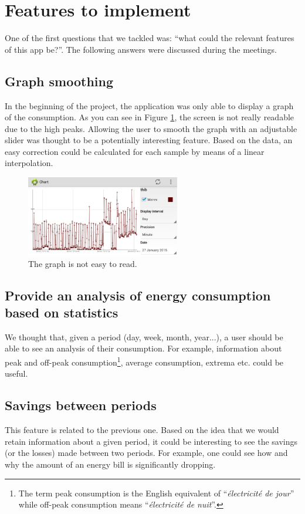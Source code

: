 \documentclass[a4paper, oneside, 11pt]{book}
\begin{document}
\section{Features to implement}
One of the first questions that we tackled was: “what could the relevant features of this app be?”.  The following answers were discussed during the meetings. 

\subsection{Graph smoothing}
In the beginning of the project, the application was only able to display a graph of the consumption. As you can see in Figure \ref{fig:chart_high_peaks}, the screen is not really readable due to the high peaks. Allowing the user to smooth the graph with an adjustable slider was thought to be a potentially interesting feature. Based on the data, an easy correction could be calculated for each sample by means of a linear interpolation. 

\begin{figure}[htbp]
	\centerline{\includegraphics[width=0.6\textwidth]{chart_high_peaks.png}}
	\caption{The graph is not easy to read.}
	\label{fig:chart_high_peaks}
\end{figure}

\subsection{Provide an analysis of energy consumption based on statistics}
We thought that, given a period (day, week, month, year...), a user should be able to see an analysis of their consumption. For example, information about peak and off-peak consumption\footnote{The term peak consumption is the English equivalent of “\textit{électricité de jour}” while off-peak consumption means “\textit{électricité de nuit}”.}, average consumption, extrema etc. could be useful.

\subsection{Savings between periods}
This feature is related to the previous one. Based on the idea that we would retain information about a given period, it could be interesting to see the savings (or the losses) made between two periods. For example, one could see how and why the amount of an energy bill is significantly dropping.
\end{document}
